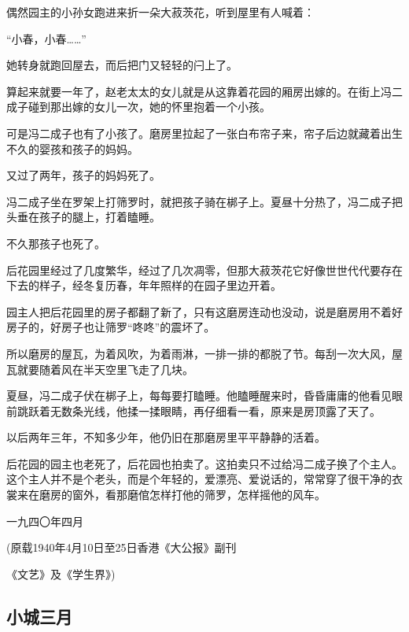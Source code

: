 \par 偶然园主的小孙女跑进来折一朵大菽茨花，听到屋里有人喊着：
\par “小春，小春……”
\par 她转身就跑回屋去，而后把门又轻轻的闩上了。
\par 算起来就要一年了，赵老太太的女儿就是从这靠着花园的厢房出嫁的。在街上冯二成子碰到那出嫁的女儿一次，她的怀里抱着一个小孩。
\par 可是冯二成子也有了小孩了。磨房里拉起了一张白布帘子来，帘子后边就藏着出生不久的婴孩和孩子的妈妈。
\par 又过了两年，孩子的妈妈死了。
\par 冯二成子坐在罗架上打筛罗时，就把孩子骑在梆子上。夏昼十分热了，冯二成子把头垂在孩子的腿上，打着瞌睡。
\par 不久那孩子也死了。
\par 后花园里经过了几度繁华，经过了几次凋零，但那大菽茨花它好像世世代代要存在下去的样子，经冬复历春，年年照样的在园子里边开着。
\par 园主人把后花园里的房子都翻了新了，只有这磨房连动也没动，说是磨房用不着好房子的，好房子也让筛罗“咚咚”的震坏了。
\par 所以磨房的屋瓦，为着风吹，为着雨淋，一排一排的都脱了节。每刮一次大风，屋瓦就要随着风在半天空里飞走了几块。
\par 夏昼，冯二成子伏在梆子上，每每要打瞌睡。他瞌睡醒来时，昏昏庸庸的他看见眼前跳跃着无数条光线，他揉一揉眼睛，再仔细看一看，原来是房顶露了天了。
\par 以后两年三年，不知多少年，他仍旧在那磨房里平平静静的活着。
\par 后花园的园主也老死了，后花园也拍卖了。这拍卖只不过给冯二成子换了个主人。这个主人并不是个老头，而是个年轻的，爱漂亮、爱说话的，常常穿了很干净的衣裳来在磨房的窗外，看那磨倌怎样打他的筛罗，怎样摇他的风车。
\par 一九四〇年四月
\par (原载1940年4月10日至25日香港《大公报》副刊
\par 《文艺》及《学生界》)




\subsection{小城三月}


